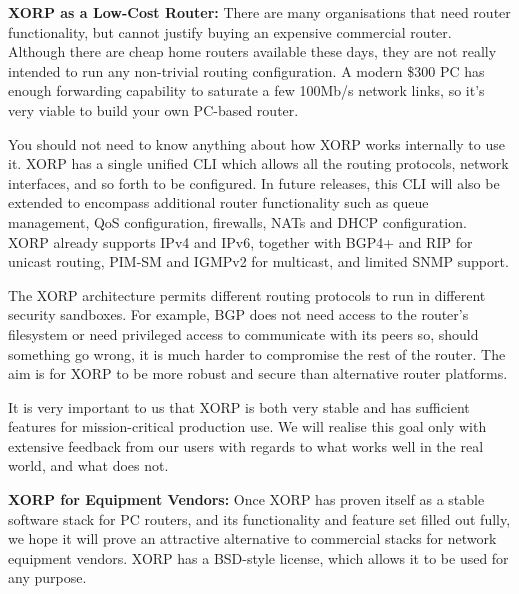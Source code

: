 \vspace{0.1in}\noindent\textbf{XORP as a Low-Cost Router:}
There are many organisations that need router functionality, but
cannot justify buying an expensive commercial router.  Although there
are cheap home routers available these days, they are not really
intended to run any non-trivial routing configuration.  A modern \$300
PC has enough forwarding capability to saturate a few 100Mb/s network
links, so it's very viable to build your own PC-based router.

You should not need to know anything about how XORP
works internally to use it.  XORP has a single unified
CLI which allows all the routing protocols, network
interfaces, and so forth to be configured.  In future releases, this
CLI will also be extended to encompass additional router functionality
such as queue management, QoS configuration, firewalls, NATs and DHCP
configuration. XORP already supports IPv4 and IPv6, together with BGP4+ and RIP for
unicast routing, PIM-SM and IGMPv2 for multicast, and limited SNMP
support.  


The XORP architecture permits different
routing protocols to run in different security sandboxes.  For
example, BGP does not need access to the router's filesystem or need
privileged access to communicate with its peers so, should something
go wrong, it is much harder to compromise the rest of the router.  The
aim is for XORP to be more robust and secure than alternative router
platforms.

It is very important to us that XORP is both very stable and has
sufficient features for mission-critical production use.  We will
realise this goal only with extensive feedback from our users with
regards to what works well in the real world, and what does not.


\vspace{0.1in}\noindent\textbf{XORP for Equipment Vendors:}
Once XORP has proven itself as a stable software stack for PC routers,
and its functionality and feature set filled out fully, we hope it
will prove an attractive alternative to commercial stacks for network
equipment vendors. XORP has a BSD-style license, which allows it to be used
for any purpose. %

